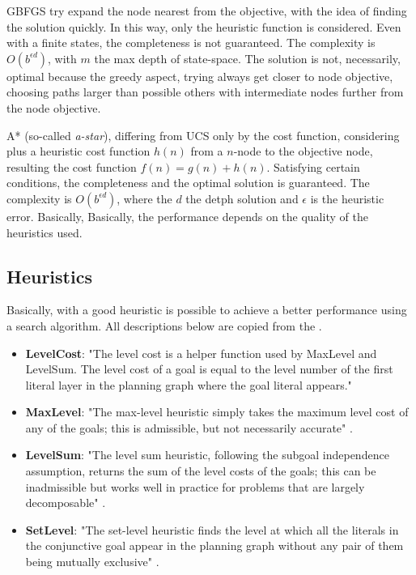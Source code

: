 \documentclass[a4paper]{article}
\begin{document}
GBFGS try expand the node nearest from the objective, with the idea of finding the solution quickly. In this way, only the heuristic function is considered. Even with a finite states, the completeness is not guaranteed. The complexity is $O(b^{\epsilon d})$, with $m$ the max depth of state-space. The solution is not, necessarily, optimal because the greedy aspect, trying always get closer to node objective, choosing paths larger than possible others with intermediate nodes further from the node objective.

A* (so-called \emph{a-star}), differing from UCS only by the cost function, considering plus a heuristic cost function $h(n)$ from a $n$-node to the objective node, resulting the cost function $f(n) = g(n) + h(n)$. Satisfying certain conditions, the completeness and the optimal solution is guaranteed. The complexity is $O(b^{\epsilon d})$, where the $d$ the detph solution and $\epsilon$ is the heuristic error. Basically, Basically, the performance depends on the quality of the heuristics used.

\subsection{Heuristics}

Basically, with a good heuristic is possible to achieve a better performance using a search algorithm. All descriptions below are copied from the \cite{githubUdacityAINDProj2}.
\begin{itemize}
    \item \textbf{LevelCost}: "The level cost is a helper function used by MaxLevel and LevelSum. The level cost of a goal is equal to the level number of the first literal layer in the planning graph where the goal literal appears."
    \item \textbf{MaxLevel}: "The max-level heuristic simply takes the maximum level cost of any of the goals; this is admissible, but not necessarily accurate" \cite{russell2009artificial}.
    \item \textbf{LevelSum}: "The level sum heuristic, following the subgoal independence assumption, returns the sum of the level costs of the goals; this can be inadmissible but works well in practice for problems that are largely decomposable" \cite{russell2009artificial}.
    \item \textbf{SetLevel}: "The set-level heuristic finds the level at which all the literals in the conjunctive goal appear in the planning graph without any pair of them being mutually exclusive" \cite{russell2009artificial}.
\end{itemize}
\end{document}
